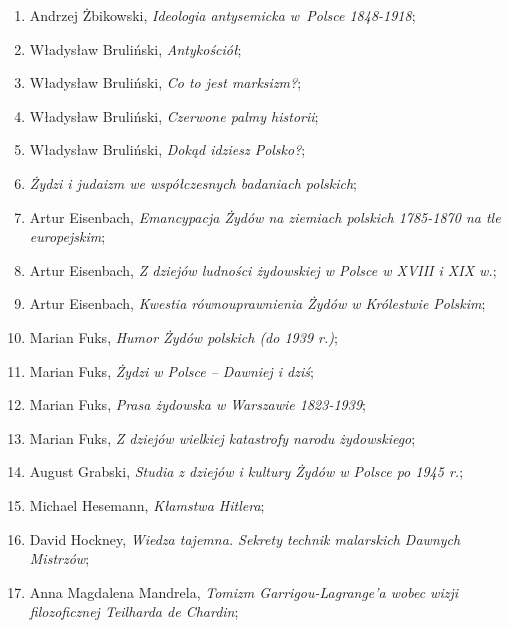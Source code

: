 \documentclass[a4paper,11pt]{article}
\begin{document}
\begin{enumerate}
\item Andrzej Żbikowski, \textit{Ideologia antysemicka w~Polsce
    1848-1918};

\item Władysław Bruliński, \textit{Antykościół};

\item Władysław Bruliński, \textit{Co to jest marksizm?};

\item Władysław Bruliński, \textit{Czerwone palmy historii};

\item Władysław Bruliński, \textit{Dokąd idziesz Polsko?};

\item \textit{Żydzi i judaizm we współczesnych badaniach polskich};

\item Artur Eisenbach, \textit{Emancypacja Żydów na ziemiach polskich
    1785-1870 na tle europejskim};

\item Artur Eisenbach, \textit{Z dziejów ludności żydowskiej w Polsce w
    XVIII i XIX w.};

\item Artur Eisenbach, \textit{Kwestia równouprawnienia Żydów w
    Królestwie Polskim};

\item Marian Fuks, \textit{Humor Żydów polskich (do 1939 r.)};

\item Marian Fuks, \textit{Żydzi w Polsce – Dawniej i dziś};

\item Marian Fuks, \textit{Prasa żydowska w Warszawie 1823-1939};

\item Marian Fuks, \textit{Z dziejów wielkiej katastrofy narodu
    żydowskiego};

\item August Grabski, \textit{Studia z dziejów i kultury Żydów w Polsce
    po 1945 r.};

\item Michael Hesemann, \textit{Kłamstwa Hitlera};

\item David Hockney, \textit{Wiedza tajemna. Sekrety technik malarskich
    Dawnych Mistrzów};

\item Anna Magdalena Mandrela, \textit{Tomizm Garrigou-Lagrange’a wobec
    wizji filozoficznej Teilharda de Chardin};


\end{enumerate}
\end{document}
